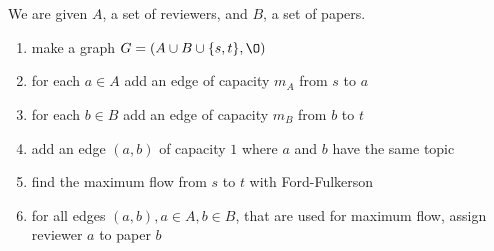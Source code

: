 \documentclass[12pt]{article}
\begin{document}
\section{} %
We are given $A$, a set of reviewers, and $B$, a set of papers.

\begin{enumerate}
	\item make a graph $G = (A \cup B \cup \{s, t\}, \O)$
	\item for each $a \in A$ add an edge of capacity $m_A$ from $s$ to $a$
	\item for each $b \in B$ add an edge of capacity $m_B$ from $b$ to $t$
	\item add an edge $(a, b)$ of capacity $1$ where $a$ and $b$ have the same topic
	\item find the maximum flow from $s$ to $t$ with Ford-Fulkerson
	\item for all edges $(a, b), a \in A, b \in B$, that are used for maximum flow, assign reviewer $a$ to paper $b$
\end{enumerate}

\section{} %
\end{document}
